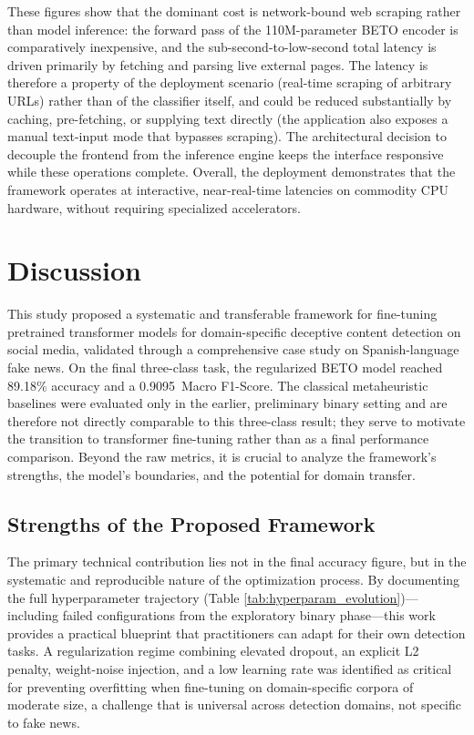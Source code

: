 \documentclass[informatics,article,accept,pdftex,moreauthors]{Definitions/mdpi}
\begin{document}
These figures show that the dominant cost is network-bound web scraping rather than model inference: the forward pass of the 110M-parameter BETO encoder is comparatively inexpensive, and the sub-second-to-low-second total latency is driven primarily by fetching and parsing live external pages. The latency is therefore a property of the deployment scenario (real-time scraping of arbitrary URLs) rather than of the classifier itself, and could be reduced substantially by caching, pre-fetching, or supplying text directly (the application also exposes a manual text-input mode that bypasses scraping). The architectural decision to decouple the frontend from the inference engine keeps the interface responsive while these operations complete. Overall, the deployment demonstrates that the framework operates at interactive, near-real-time latencies on commodity CPU hardware, without requiring specialized accelerators.

\section{Discussion}

This study proposed a systematic and transferable framework for fine-tuning pretrained transformer models for domain-specific deceptive content detection on social media, validated through a comprehensive case study on Spanish-language fake news. On the final three-class task, the regularized BETO model reached 89.18\% accuracy and a \mbox{0.9095 Macro} F1-Score. The classical metaheuristic baselines were evaluated only in the earlier, preliminary binary setting and are therefore not directly comparable to this three-class result; they serve to motivate the transition to transformer fine-tuning rather than as a final performance comparison. Beyond the raw metrics, it is crucial to analyze the framework's strengths, the model's boundaries, and the potential for domain transfer.

\subsection{Strengths of the Proposed Framework}
The primary technical contribution lies not in the final accuracy figure, but in the systematic and reproducible nature of the optimization process. By documenting the full hyperparameter trajectory (Table \ref{tab:hyperparam_evolution})—including failed configurations from the exploratory binary phase—this work provides a practical blueprint that practitioners can adapt for their own detection tasks. A regularization regime combining elevated dropout, an explicit L2 penalty, weight-noise injection, and a low learning rate was identified as critical for preventing overfitting when fine-tuning on domain-specific corpora of moderate size, a challenge that is universal across detection domains, not specific to fake news.
\end{document}
